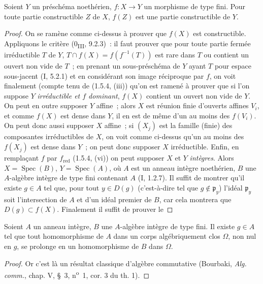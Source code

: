 \begin{corollary}[1.8.5]
\label{IV.1.8.5-fr}
Soient $Y$ un préschéma noethérien, $f:X\to Y$ un morphisme de type fini.
Pour toute partie constructible $Z$ de $X$, $f(Z)$ est une partie
constructible de $Y$.
\end{corollary}


\begin{proof}
On se ramène comme ci-dessus à prouver que $f(X)$ est constructible.
Appliquons le critère (0\textsubscript{III}, 9.2.3)~: il faut prouver que pour
toute partie fermée irréductible $T$ de $Y$, $T\cap f(X)=f(f^{-1}(T))$ est
rare dans $T$ ou contient un ouvert non vide de $T$~; en prenant un
sous-préschéma de $Y$ ayant $T$ pour espace sous-jacent (I, 5.2.1) et en
considérant son image réciproque par $f$, on voit finalement (compte tenu de
(1.5.4, (iii)) qu'on est ramené à prouver que si l'on suppose $Y$
\emph{irréductible et $f$ dominant}, $f(X)$ contient un ouvert non vide de
$Y$. On peut en outre supposer $Y$ affine~; alors $X$ est réunion finie
d'ouverts affines $V_i$, et comme $f(X)$ est dense dans $Y$, il en est de
même d'un au moins des $f(V_i)$. On peut donc aussi supposer $X$ affine~; si
$(X_j)$ est la famille (finie) des composantes irréductibles de $X$, on voit
comme ci-dessus qu'un au moins des $f(X_j)$ est dense dans $Y$~; on peut donc
supposer $X$ irréductible. Enfin, en remplaçant $f$ par $f_{\mathrm{red}}$
(1.5.4, (vi)) on peut supposer $X$ et $Y$ \emph{intègres}. Alors
$X=\operatorname{Spec}(B)$, $Y=\operatorname{Spec}(A)$, où $A$ est un
anneau intègre noethérien, $B$ une $A$-algèbre intègre de type fini contenant
$A$ (I, 1.2.7). Il suffit de montrer qu'il existe $g\in A$ tel que, pour tout
$y\in D(g)$ (c'est-à-dire tel que $g\notin\mathfrak p_y$) l'idéal
$\mathfrak p_y$ soit l'intersection de $A$ et d'un idéal premier de $B$, car
cela montrera que $D(g)\subset f(X)$. Finalement il suffit de prouver le
\end{proof}

\begin{lemma}[1.8.5.1]
\label{IV.1.8.5.1-fr}
Soient $A$ un anneau intègre, $B$ une $A$-algèbre intègre de type fini. Il
existe $g\in A$ tel que tout homomorphisme de $A$ dans un corps
algébriquement clos $\Omega$, non nul en $g$, se prolonge en un homomorphisme
de $B$ dans $\Omega$.
\end{lemma}

\begin{proof}
Or c'est là un résultat classique d'algèbre commutative (Bourbaki,
\emph{Alg. comm.}, chap. V, \S~3, n\textsuperscript{o}~1, cor. 3 du th. 1).
\end{proof}

